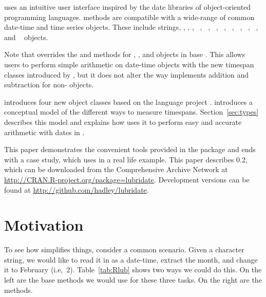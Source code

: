 \documentclass[article]{jss}
\begin{document}
 uses an intuitive user interface inspired by the date libraries of object-oriented programming languages.   methods are compatible with a wide-range of common date-time and time series objects. These include  strings, , , ,  ~\citep{chron},  ~\citep{timeDate},  ~\citep{zoo},  ~\citep{xts},  ~\citep{its},  ~\citep{tis},  ~\citep{timeSeries},  ~\citep{fts}, and  ~\citep{tseries} objects.

Note that  overrides the \code{+} and \code{-} methods for , , and  objects in base . This allows users to perform simple arithmetic on date-time objects with the new timespan classes introduced by , but it does not alter the way  implements addition and subtraction for non- objects.

 introduces four new object classes based on the  language  project \citep{jodatime}.  introduces a conceptual model of the different ways to measure timespans. Section~\ref{sec:types} describes this model and explains how  uses it to perform easy and accurate arithmetic with dates in .



This paper demonstrates the convenient tools provided in the  package and ends with a case study, which uses  in a real life example. This paper describes  0.2, which can be downloaded from the Comprehensive  Archive Network at \url{http://CRAN.R-project.org/package=lubridate}. Development versions can be found at \url{http://github.com/hadley/lubridate}.

\section{Motivation}

To see how  simplifies things, consider a common scenario. Given a character string, we would like to read it in as a date-time, extract the month, and change it to February (i.e,~2). Table~\ref{tab:Rlub} shows two ways we could do this. On the left are the base  methods we would use for these three tasks.  On the right are the  methods.
\end{document}
